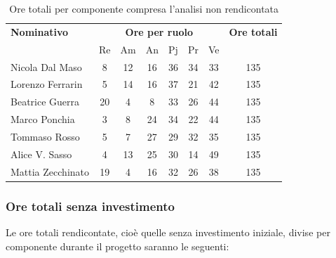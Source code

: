 \begin{table}[H]
	\centering
	\begin{tabular}{|l|c|c|c|c|c|c|c|}
		\hline
		\textbf{Nominativo} & 
		\multicolumn{6}{c|}{\textbf{Ore per ruolo}} & 
		\textbf{Ore totali} \\
		& Re & Am & An & Pj & Pr & Ve & \\
		\hline
		Nicola Dal Maso &8 &12 &16 &36 &34 &33 & 135 \\
		Lorenzo Ferrarin &5 &14 &16 &37 &21 &42 & 135 \\
		Beatrice Guerra &20 &4 &8 &33 &26 &44 & 135 \\
		Marco Ponchia &3 &8 &24 &34 &22 &44 & 135 \\
		Tommaso Rosso &5 &7 &27 &29 &32 &35 & 135 \\
		Alice V. Sasso &4 &13 &25 &30 &14 &49 & 135 \\
		Mattia Zecchinato &19 &4 &16 &32 &26 &38 & 135 \\
		\hline
	\end{tabular}
	\caption{Ore totali per componente compresa l'analisi non rendicontata}
\end{table}

\subsubsection{Ore totali senza investimento}
Le ore totali rendicontate, cioè quelle senza investimento iniziale, divise per componente durante il progetto saranno le seguenti:

